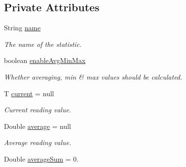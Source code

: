 \subsection*{Private Attributes}
\begin{DoxyCompactItemize}
\item 
\mbox{\label{class_android_app_1_1_data_item_a7e6d01c4d449403e707e99fce240b33b}} 
String \hyperlink{class_android_app_1_1_data_item_a7e6d01c4d449403e707e99fce240b33b}{name}
\begin{DoxyCompactList}\small\item\em The name of the statistic. \end{DoxyCompactList}\item 
\mbox{\label{class_android_app_1_1_data_item_a330d3ade00b732f202d73dbb0d3b711f}} 
boolean \hyperlink{class_android_app_1_1_data_item_a330d3ade00b732f202d73dbb0d3b711f}{enable\+Avg\+Min\+Max}
\begin{DoxyCompactList}\small\item\em Whether averaging, min \& max values should be calculated. \end{DoxyCompactList}\item 
\mbox{\label{class_android_app_1_1_data_item_aef9fad1dca931e60708187ab89769f54}} 
T \hyperlink{class_android_app_1_1_data_item_aef9fad1dca931e60708187ab89769f54}{current} = null
\begin{DoxyCompactList}\small\item\em Current reading value. \end{DoxyCompactList}\item 
\mbox{\label{class_android_app_1_1_data_item_a231634a35289bb35c46f7fa3111cd472}} 
Double \hyperlink{class_android_app_1_1_data_item_a231634a35289bb35c46f7fa3111cd472}{average} = null
\begin{DoxyCompactList}\small\item\em Average reading value. \end{DoxyCompactList}\item 
\mbox{\label{class_android_app_1_1_data_item_aa146ca811e2838ef5c5621c99c712cda}} 
Double \hyperlink{class_android_app_1_1_data_item_aa146ca811e2838ef5c5621c99c712cda}{average\+Sum} = 0.

\end{DoxyCompactItemize}
